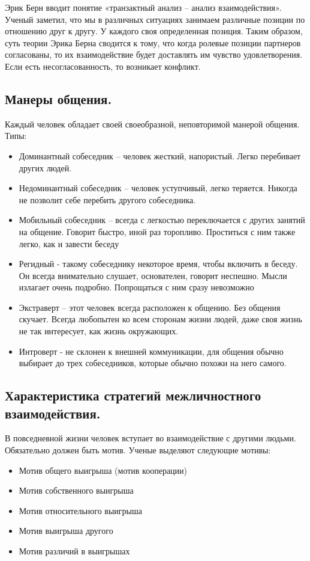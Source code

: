 Эрик Берн вводит понятие «транзактный анализ – анализ взаимодействия».
Ученый заметил, что мы в различных ситуациях занимаем различные позиции по отношению друг к другу. У каждого своя определенная позиция. Таким образом, суть теории Эрика Берна сводится к тому, что когда ролевые позиции партнеров согласованы, то их взаимодействие будет доставлять им чувство удовлетворения. Если есть несогласованность, то возникает конфликт.

\subsection{Манеры общения.}
Каждый человек обладает своей своеобразной, неповторимой манерой общения.
Типы:
\begin{itemize}
    \item Доминантный собеседник – человек жесткий, напористый. Легко перебивает других людей.
    \item Недоминантный собеседник – человек уступчивый, легко теряется. Никогда не позволит себе перебить другого собеседника. 
    \item Мобильный собеседник – всегда с легкостью переключается с других занятий на общение. Говорит быстро, иной раз торопливо. Проститься с ним также легко, как и завести беседу
    \item Регидный  - такому собеседнику некоторое время, чтобы включить в беседу. Он всегда внимательно слушает, основателен, говорит неспешно. Мысли излагает очень подробно. Попрощаться с ним сразу невозможно 
    \item Экстраверт – этот человек всегда расположен к общению. Без общения скучает. Всегда любопытен ко всем сторонам жизни людей, даже своя жизнь не так интересует, как жизнь окружающих.
    \item Интроверт  - не склонен к внешней коммуникации, для общения обычно выбирает до трех собеседников, которые обычно похожи на него самого.
\end{itemize}

\subsection{Характеристика стратегий межличностного взаимодействия.}
В повседневной жизни человек вступает во взаимодействие с другими людьми.
Обязательно должен быть мотив. Ученые выделяют следующие мотивы:
\begin{itemize}
    \item Мотив общего выигрыша (мотив кооперации) 
    \item Мотив собственного выигрыша 
    \item Мотив относительного выигрыша 
    \item Мотив выигрыша другого
    \item Мотив различий в выигрышах
\end{itemize}

